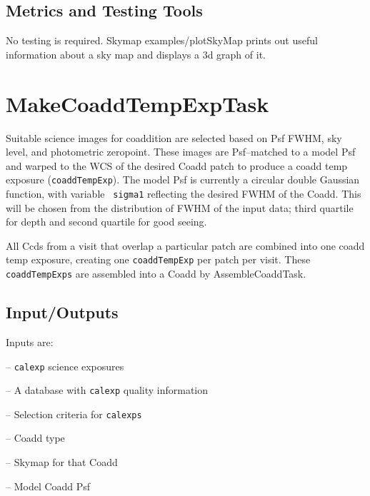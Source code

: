\documentclass[prd, nofootinbib, floatfix, 11pt,tightenlines,times]{article}
\begin{document}

\subsection{Metrics and Testing Tools}

No testing is required.  Skymap examples/plotSkyMap prints out useful
information about a sky map and displays a 3d graph of it.


\section{MakeCoaddTempExpTask} 

Suitable science images for coaddition are selected based on Psf FWHM,
sky level, and photometric zeropoint.  These images are Psf--matched
to a model Psf and warped to the WCS of the desired Coadd patch to
produce a coadd temp exposure ({\tt coaddTempExp}).  The model Psf is
currently a circular double Gaussian function, with variable {\tt
  sigma1} reflecting the desired FWHM of the Coadd.  This will be
chosen from the distribution of FWHM of the input data; third quartile
for depth and second quartile for good seeing.

All Ccds from a visit that overlap a particular patch are combined
into one coadd temp exposure, creating one {\tt coaddTempExp} per
patch per visit.  These {\tt coaddTempExps} are assembled into a
Coadd by AssembleCoaddTask.

\subsection{Input/Outputs}

Inputs are:

-- {\tt calexp} science exposures 

-- A database with {\tt calexp} quality information 

-- Selection criteria for {\tt calexps}

-- Coadd type 

-- Skymap for that Coadd

-- Model Coadd Psf 
\end{document}
